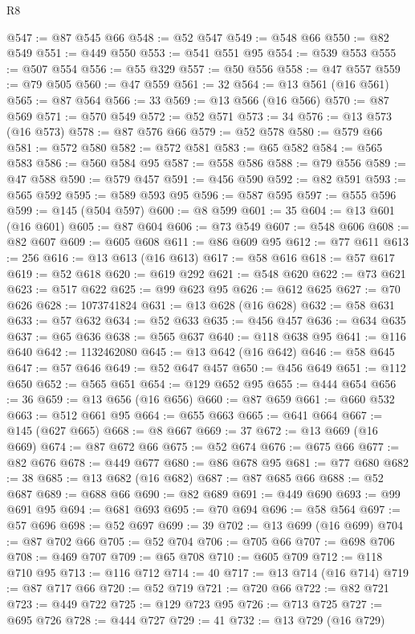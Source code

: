\begin{lexlean}{R8}
\begin{coremodule}
@547 := @87 @545 @66
@548 := @52 @547
@549 := @548 @66
@550 := @82 @549
@551 := @449 @550
@553 := @541 @551 @95
@554 := @539 @553
@555 := @507 @554
@556 := @55 @329
@557 := @50 @556
@558 := @47 @557
@559 := @79 @505
@560 := @47 @559
@561 := 32
@564 := @13 @561 (@16 @561)
@565 := @87 @564
@566 := 33
@569 := @13 @566 (@16 @566)
@570 := @87 @569
@571 := @570 @549
@572 := @52 @571
@573 := 34
@576 := @13 @573 (@16 @573)
@578 := @87 @576 @66
@579 := @52 @578
@580 := @579 @66
@581 := @572 @580
@582 := @572 @581
@583 := @65 @582
@584 := @565 @583
@586 := @560 @584 @95
@587 := @558 @586
@588 := @79 @556
@589 := @47 @588
@590 := @579 @457
@591 := @456 @590
@592 := @82 @591
@593 := @565 @592
@595 := @589 @593 @95
@596 := @587 @595
@597 := @555 @596
@599 := @145 (@504 @597)
@600 := @8 @599
@601 := 35
@604 := @13 @601 (@16 @601)
@605 := @87 @604
@606 := @73 @549
@607 := @548 @606
@608 := @82 @607
@609 := @605 @608
@611 := @86 @609 @95
@612 := @77 @611
@613 := 256
@616 := @13 @613 (@16 @613)
@617 := @58 @616
@618 := @57 @617
@619 := @52 @618
@620 := @619 @292
@621 := @548 @620
@622 := @73 @621
@623 := @517 @622
@625 := @99 @623 @95
@626 := @612 @625
@627 := @70 @626
@628 := 1073741824
@631 := @13 @628 (@16 @628)
@632 := @58 @631
@633 := @57 @632
@634 := @52 @633
@635 := @456 @457
@636 := @634 @635
@637 := @65 @636
@638 := @565 @637
@640 := @118 @638 @95
@641 := @116 @640
@642 := 1132462080
@645 := @13 @642 (@16 @642)
@646 := @58 @645
@647 := @57 @646
@649 := @52 @647 @457
@650 := @456 @649
@651 := @112 @650
@652 := @565 @651
@654 := @129 @652 @95
@655 := @444 @654
@656 := 36
@659 := @13 @656 (@16 @656)
@660 := @87 @659
@661 := @660 @532
@663 := @512 @661 @95
@664 := @655 @663
@665 := @641 @664
@667 := @145 (@627 @665)
@668 := @8 @667
@669 := 37
@672 := @13 @669 (@16 @669)
@674 := @87 @672 @66
@675 := @52 @674
@676 := @675 @66
@677 := @82 @676
@678 := @449 @677
@680 := @86 @678 @95
@681 := @77 @680
@682 := 38
@685 := @13 @682 (@16 @682)
@687 := @87 @685 @66
@688 := @52 @687
@689 := @688 @66
@690 := @82 @689
@691 := @449 @690
@693 := @99 @691 @95
@694 := @681 @693
@695 := @70 @694
@696 := @58 @564
@697 := @57 @696
@698 := @52 @697
@699 := 39
@702 := @13 @699 (@16 @699)
@704 := @87 @702 @66
@705 := @52 @704
@706 := @705 @66
@707 := @698 @706
@708 := @469 @707
@709 := @65 @708
@710 := @605 @709
@712 := @118 @710 @95
@713 := @116 @712
@714 := 40
@717 := @13 @714 (@16 @714)
@719 := @87 @717 @66
@720 := @52 @719
@721 := @720 @66
@722 := @82 @721
@723 := @449 @722
@725 := @129 @723 @95
@726 := @713 @725
@727 := @695 @726
@728 := @444 @727
@729 := 41
@732 := @13 @729 (@16 @729)

\end{coremodule}
\end{lexlean}
